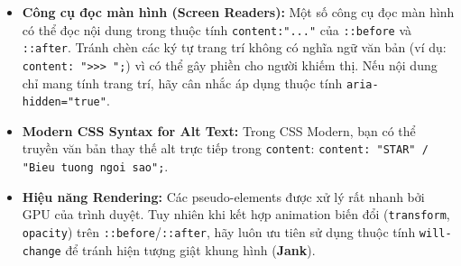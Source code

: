 \documentclass[11pt,oneside]{book}
\newcommand{\thd}[1]{\textcolor{white}{\textbf{\strut #1}}}
\newcommand{\codeinline}[1]{\textcolor{accentOrange}{\texttt{#1}}}
\newcommand{\term}[1]{\textbf{\textcolor{primaryBlue}{#1}}}
\begin{document}
\begin{prettyTableBox}
\sffamily\small
{}
\end{prettyTableBox}

\begin{warnBox}
\begin{itemize}[leftmargin=1.5em, itemsep=4pt, parsep=0pt]
    \item \textbf{Công cụ đọc màn hình (Screen Readers):} Một số công cụ đọc màn hình có thể đọc nội dung trong thuộc tính \codeinline{content:"..."} của \codeinline{::before} và \codeinline{::after}. Tránh chèn các ký tự trang trí không có nghĩa ngữ văn bản (ví dụ: \codeinline{content: ">>> ";}) vì có thể gây phiền cho người khiếm thị. Nếu nội dung chỉ mang tính trang trí, hãy cân nhắc áp dụng thuộc tính \codeinline{aria-hidden="true"}.
    \item \textbf{Modern CSS Syntax for Alt Text:} Trong CSS Modern, bạn có thể truyền văn bản thay thế alt trực tiếp trong \codeinline{content}: \codeinline{content: "STAR" / "Bieu tuong ngoi sao";}.
    \item \textbf{Hiệu năng Rendering:} Các pseudo-elements được xử lý rất nhanh bởi GPU của trình duyệt. Tuy nhiên khi kết hợp animation biến đổi (\codeinline{transform}, \codeinline{opacity}) trên \codeinline{::before}/\codeinline{::after}, hãy luôn ưu tiên sử dụng thuộc tính \codeinline{will-change} để tránh hiện tượng giật khung hình (\term{Jank}).
\end{itemize}
\end{warnBox}
\end{document}
